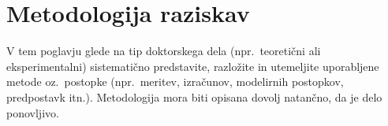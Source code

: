 \chapter{Metodologija raziskav}\label{cha:metodologija}
V tem poglavju glede na tip doktorskega dela (npr.~teoretični ali eksperimentalni) sistematično predstavite, razložite in utemeljite uporabljene metode oz.~postopke (npr.~meritev, izračunov, modelirnih postopkov, predpostavk itn.). Metodologija mora biti opisana dovolj natančno, da je delo ponovljivo.
